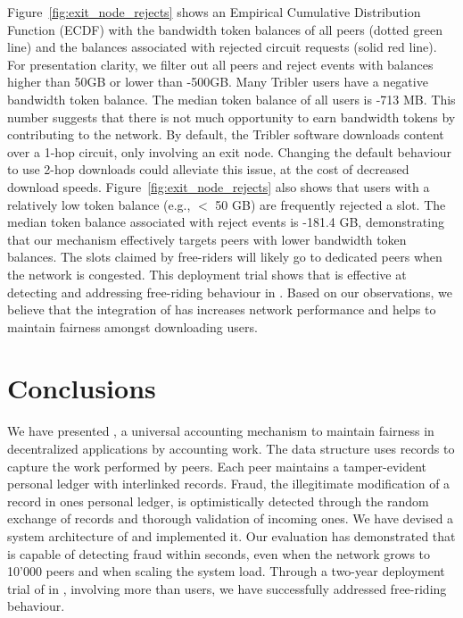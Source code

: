 Figure~\ref{fig:exit_node_rejects} shows an Empirical Cumulative Distribution Function (ECDF) with the bandwidth token balances of all peers (dotted green line) and the balances associated with rejected circuit requests (solid red line).
For presentation clarity, we filter out all peers and reject events with balances higher than 50GB or lower than -500GB.
Many Tribler users have a negative bandwidth token balance.
The median token balance of all users is -713 MB.
This number suggests that there is not much opportunity to earn bandwidth tokens by contributing to the network.
By default, the Tribler software downloads content over a 1-hop circuit, only involving an exit node.
Changing the default behaviour to use 2-hop downloads could alleviate this issue, at the cost of decreased download speeds.
Figure~\ref{fig:exit_node_rejects} also shows that users with a relatively low token balance (e.g., $ < $ 50 GB) are frequently rejected a slot.
The median token balance associated with reject events is -181.4 GB, demonstrating that our mechanism effectively targets peers with lower bandwidth token balances.
The slots claimed by free-riders will likely go to dedicated peers when the network is congested.
This deployment trial shows that \TrustChain{} is effective at detecting and addressing free-riding behaviour in \Tribler{}.
Based on our observations, we believe that the integration of \TrustChain{} has increases network performance and helps to maintain fairness amongst downloading users.



\section{Conclusions}
We have presented \TrustChain{}, a universal accounting mechanism to maintain fairness in decentralized applications by accounting work.
The \TrustChain{} data structure uses records to capture the work performed by peers.
Each peer maintains a tamper-evident personal ledger with interlinked records.
Fraud, the illegitimate modification of a record in ones personal ledger, is optimistically detected through the random exchange of records and thorough validation of incoming ones.
We have devised a system architecture of \TrustChain{} and implemented it.
Our evaluation has demonstrated that \TrustChain{} is capable of detecting fraud within seconds, even when the network grows to 10'000 peers and when scaling the system load.
Through a two-year deployment trial of \TrustChain{} in \Tribler{}, involving more than \TrialUsers{} users, we have successfully addressed free-riding behaviour.

